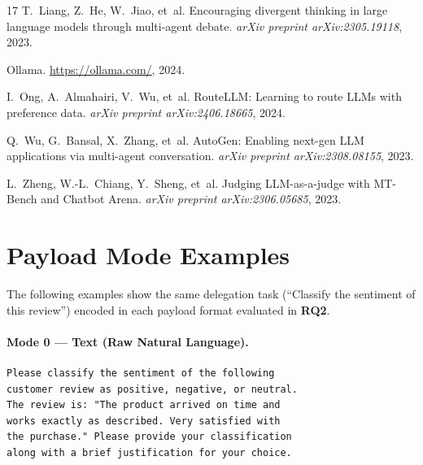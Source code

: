 \documentclass[11pt,a4paper]{article}
\newcommand{\RQ}[1]{\textbf{RQ#1}}
\begin{document}
\begin{thebibliography}{17}
T.~Liang, Z.~He, W.~Jiao, et~al.
\newblock Encouraging divergent thinking in large language models through multi-agent debate.
\newblock \emph{arXiv preprint arXiv:2305.19118}, 2023.

Ollama.
\newblock \url{https://ollama.com/}, 2024.

I.~Ong, A.~Almahairi, V.~Wu, et~al.
\newblock RouteLLM: Learning to route LLMs with preference data.
\newblock \emph{arXiv preprint arXiv:2406.18665}, 2024.

Q.~Wu, G.~Bansal, X.~Zhang, et~al.
\newblock AutoGen: Enabling next-gen LLM applications via multi-agent conversation.
\newblock \emph{arXiv preprint arXiv:2308.08155}, 2023.

L.~Zheng, W.-L.~Chiang, Y.~Sheng, et~al.
\newblock Judging LLM-as-a-judge with MT-Bench and Chatbot Arena.
\newblock \emph{arXiv preprint arXiv:2306.05685}, 2023.

\end{thebibliography}


\appendix

\section{Payload Mode Examples}
\label{app:payload-examples}

The following examples show the same delegation task (``Classify the sentiment of this review'') encoded in each payload format evaluated in \RQ{2}.

\paragraph{Mode 0 --- Text (Raw Natural Language).}
\begin{lstlisting}[style=protocol]
Please classify the sentiment of the following
customer review as positive, negative, or neutral.
The review is: "The product arrived on time and
works exactly as described. Very satisfied with
the purchase." Please provide your classification
along with a brief justification for your choice.
\end{lstlisting}
\end{document}
